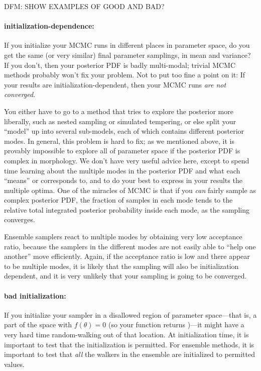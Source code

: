 \documentclass[12pt,twoside,pdftex]{article}
\newcommand{\pars}{\theta}
\begin{document}
DFM: SHOW EXAMPLES OF GOOD AND BAD?

\paragraph{initialization-dependence:}
If you initialize your MCMC runs in different places in parameter space,
  do you get the same (or very similar) final parameter samplings,
  in mean and variance?
If you don't,
  then your posterior PDF is badly multi-modal;
  trivial MCMC methods probably won't fix your problem.
Not to put too fine a point on it:
If your results are initialization-dependent,
  then your MCMC runs \emph{are not converged}.

You either have to go to a method that tries to explore the posterior
  more liberally, such as nested sampling or simulated tempering,
  or else split your ``model'' up into several sub-models,
  each of which contains different posterior modes.
In general, this problem is hard to fix;
  as we mentioned above, it is provably impossible
  to explore all of parameter space if the posterior PDF is
  complex in morphology.
We don't have very useful advice here, except to
  spend time learning about the multiple modes in the posterior PDF
  and what each ``means'' or corresponds to,
  and to do your best to express in your results the multiple optima.
One of the miracles of MCMC is that if you \emph{can} fairly sample
  as complex posterior PDF,
  the fraction of samples in each mode
  tends to the relative total integrated posterior probability inside each mode,
  as the sampling converges.

Ensemble samplers react to multiple modes
  by obtaining very low acceptance ratio,
  because the samplers in the different modes are not easily able to ``help one another''
  move efficiently.
Again, if the acceptance ratio is low and there appear to be multiple modes,
  it is likely that the sampling will also be initialization dependent,
  and it is very unlikely that your sampling is going to be converged.

\paragraph{bad initialization:}
If you initialize your sampler in a disallowed region of parameter
space---that is, a part of the space with $f(\pars)=0$ (so your
 function returns )---it might have a very
hard time random-walking out of that location.
At initialization time, it is important to test that the
initialization is permitted.
For ensemble methods, it is important to test that \emph{all} the
walkers in the ensemble are initialized to permitted values.
\end{document}
